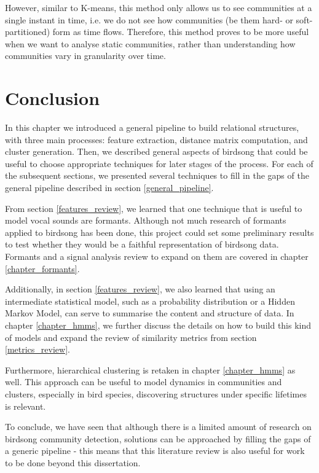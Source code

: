 \documentclass[../main.tex]{subfiles} \label{chapter_soa}
\begin{document}
\par However, similar to K-means, this method only allows us to see communities at a single instant in time, i.e. we do not see how communities (be them hard- or soft-partitioned) form as time flows. Therefore, this method proves to be more useful when we want to analyse static communities, rather than understanding how communities vary in granularity over time.

\section{Conclusion}
In this chapter we introduced a general pipeline to build relational structures, with three main processes: feature extraction, distance matrix computation, and cluster generation. Then, we described general aspects of birdsong that could be useful to choose appropriate techniques for later stages of the process. For each of the subsequent sections, we presented several techniques to fill in the gaps of the general pipeline described in section \ref{general_pipeline}.
\par From section \ref{features_review}, we learned that one technique that is useful to model vocal sounds are formants. Although not much research of formants applied to birdsong has been done, this project could set some preliminary results to test whether they would be a faithful representation of birdsong data. Formants and a signal analysis review to expand on them are covered in chapter \ref{chapter_formants}.
\par Additionally, in section \ref{features_review}, we also learned that using an intermediate statistical model, such as a probability distribution or a Hidden Markov Model, can serve to summarise the content and structure of data. In chapter \ref{chapter_hmms}, we further discuss the details on how to build this kind of models and expand the review of similarity metrics from section \ref{metrics_review}.
\par Furthermore, hierarchical clustering is retaken in chapter \ref{chapter_hmms} as well. This approach can be useful to model dynamics in communities and clusters, especially in bird species, discovering structures under specific lifetimes is relevant. 
\par To conclude, we have seen that although there is a limited amount of research on birdsong community detection, solutions can be approached by filling the gaps of a generic pipeline - this means that this literature review is also useful for work to be done beyond this dissertation.
\end{document}

